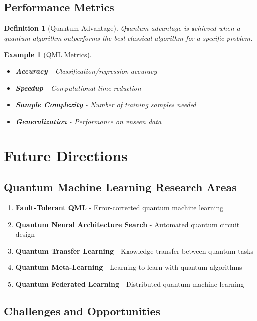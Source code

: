 \documentclass[11pt]{article}
\newtheorem{definition}{Definition}[section]
\newtheorem{example}{Example}[section]
\begin{document}
\subsection{Performance Metrics}

\begin{definition}[Quantum Advantage]
Quantum advantage is achieved when a quantum algorithm outperforms the best classical algorithm for a specific problem.
\end{definition}

\begin{example}[QML Metrics]
\begin{itemize}
    \item \textbf{Accuracy} - Classification/regression accuracy
    \item \textbf{Speedup} - Computational time reduction
    \item \textbf{Sample Complexity} - Number of training samples needed
    \item \textbf{Generalization} - Performance on unseen data
\end{itemize}
\end{example}

\section{Future Directions}

\subsection{Quantum Machine Learning Research Areas}

\begin{enumerate}
    \item \textbf{Fault-Tolerant QML} - Error-corrected quantum machine learning
    \item \textbf{Quantum Neural Architecture Search} - Automated quantum circuit design
    \item \textbf{Quantum Transfer Learning} - Knowledge transfer between quantum tasks
    \item \textbf{Quantum Meta-Learning} - Learning to learn with quantum algorithms
    \item \textbf{Quantum Federated Learning} - Distributed quantum machine learning
\end{enumerate}

\subsection{Challenges and Opportunities}
\end{document}
